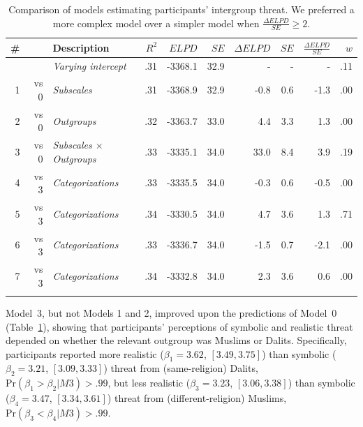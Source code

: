 \documentclass[12pt, a4paper]{article}
\begin{document}
\begin{table}
\centering
{}
\caption[Model comparison for intergroup threat]{Comparison of models estimating participants' intergroup threat. We preferred a more complex model over a simpler model when $\frac{\Delta\textit{ELPD}}{\textit{SE}} \geq 2$.}
\small	
\begin{tabularx}{\linewidth}{r@{~}rXrrrrrrr} \toprule
\# &  &  Description &  $R^2$ & $\textit{ELPD}$ & $\textit{SE}$ & $\Delta\textit{ELPD}$ & $\textit{SE}$ & $\frac{\Delta\textit{ELPD}}{\textit{SE}}$ & $w$ \\ \midrule \addlinespace
0 &      & \textit{Varying intercept} & .31 & -3368.1 & 32.9 & - & - & - & .11 \\
1 & vs 0 & \textit{Subscales}         & .31 & -3368.9 & 32.9 & -0.8 & 0.6 & -1.3 & .00 \\
2 & vs 0 & \textit{Outgroups} & .32 & -3363.7 & 33.0 & 4.4 & 3.3 & 1.3 & .00 \\
3 & vs 0 & \textit{Subscales $\times$ Outgroups} & .33 & -3335.1 & 34.0 & 33.0 & 8.4 & 3.9 & .19 \\ \midrule
4 & vs 3 & \textit{Categorizations}   & .33 & -3335.5 & 34.0 & -0.3 & 0.6 & -0.5 & .00 \\
5 & vs 3 & \textit{Categorizations}   & .34 & -3330.5 & 34.0 & 4.7 & 3.6 & 1.3 & .71 \\
6 & vs 3 & \textit{Categorizations}   & .33 & -3336.7 & 34.0 & -1.5 & 0.7 & -2.1 & .00 \\
7 & vs 3 & \textit{Categorizations}   & .34 & -3332.8 & 34.0 & 2.3 & 3.6 & 0.6 & .00 \\ \addlinespace \bottomrule
\end{tabularx}
\label{tab:c-1}
\end{table}

Model~3, but not Models 1 and 2, improved upon the predictions of Model~0 (Table~\ref{tab:c-1}), showing that participants' perceptions of symbolic and realistic threat depended on whether the relevant outgroup was Muslims or Dalits. Specifically, participants reported more realistic ($ \beta_1 = 3.62$, $[3.49, 3.75]$) than symbolic ($\beta_2 = 3.21$, $[3.09, 3.33]$) threat from (same-religion) Dalits, $\text{Pr} (\beta_1 > \beta_2|M3) > .99$, but less realistic ($\beta_3 = 3.23$, $[3.06, 3.38]$) than symbolic ($\beta_4 = 3.47$, $[3.34, 3.61]$) threat from (different-religion) Muslims, $\text{Pr} (\beta_3 < \beta_4| M3) > .99$.
\end{document}

